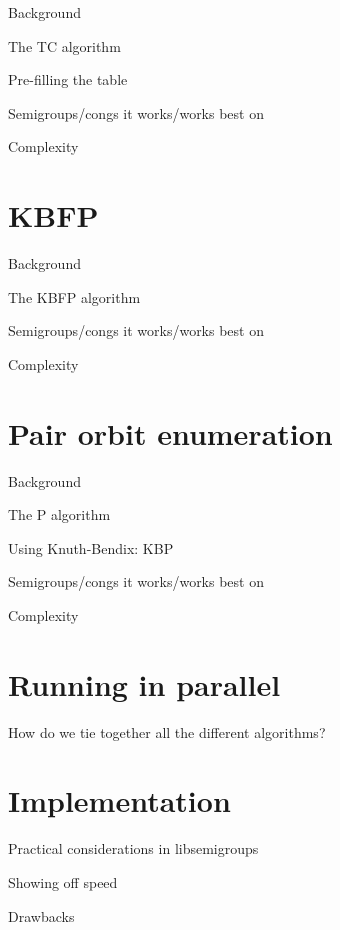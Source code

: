 Background

The TC algorithm

Pre-filling the table

Semigroups/congs it works/works best on

Complexity

\section{KBFP}
\label{sec:kbfp}

Background

The KBFP algorithm

Semigroups/congs it works/works best on

Complexity

\section{Pair orbit enumeration}
\label{sec:p}

Background

The P algorithm

Using Knuth-Bendix: KBP

Semigroups/congs it works/works best on

Complexity

\section{Running in parallel}

How do we tie together all the different algorithms?

\section{Implementation}

Practical considerations in libsemigroups

Showing off speed

Drawbacks
